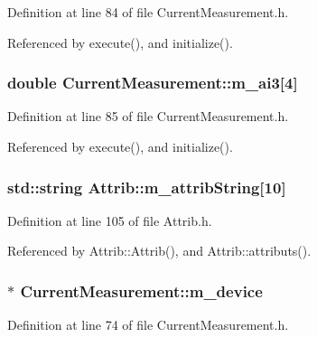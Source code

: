 Definition at line 84 of file CurrentMeasurement.h.

Referenced by execute(), and initialize().\hypertarget{classCurrentMeasurement_aa1223e4b36335ceb507edd12d4cfa8ad}{
\subsubsection[{m\_\-ai3}]{\setlength{\rightskip}{0pt plus 5cm}double {\bf CurrentMeasurement::m\_\-ai3}\mbox{[}4\mbox{]}}}
\label{classCurrentMeasurement_aa1223e4b36335ceb507edd12d4cfa8ad}


Definition at line 85 of file CurrentMeasurement.h.

Referenced by execute(), and initialize().\hypertarget{classAttrib_a3414521d7a82476e874b25a5407b5e63}{
\subsubsection[{m\_\-attribString}]{\setlength{\rightskip}{0pt plus 5cm}std::string {\bf Attrib::m\_\-attribString}\mbox{[}10\mbox{]}}}
\label{classAttrib_a3414521d7a82476e874b25a5407b5e63}


Definition at line 105 of file Attrib.h.

Referenced by Attrib::Attrib(), and Attrib::attributs().\hypertarget{classCurrentMeasurement_a7df157175089da57bd020b8680e87f80}{
\subsubsection[{m\_\-device}]{$\ast$ {\bf CurrentMeasurement::m\_\-device}}}
\label{classCurrentMeasurement_a7df157175089da57bd020b8680e87f80}


Definition at line 74 of file CurrentMeasurement.h.

